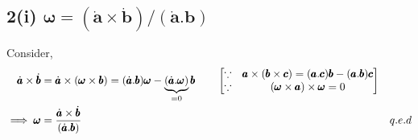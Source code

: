 \subsection{2(i) $\pmb \omega = (\dot{\pmb a} \times \dot{\pmb b}) / (\dot{\pmb a} . \pmb b)$}

Consider,
\begin{align*}
    \dot{\pmb a} \times \dot{\pmb b} &= \dot{\pmb a} \times (\pmb \omega \times \pmb b) = (\dot{\pmb a}.\pmb b)\pmb \omega - \underbrace{(\dot{\pmb a} . \pmb \omega)}_{=0} \pmb b
    \qquad
    \begin{bmatrix} \because& \pmb a \times (\pmb b \times \pmb c) = (\pmb a.\pmb c)\pmb b - (\pmb a.\pmb b)\pmb c\\
    \because& (\pmb \omega \times \pmb a) \times \pmb \omega = 0  \end{bmatrix}\\
    \implies \pmb \omega &= \frac{\dot{\pmb a} \times \dot{\pmb b}}{(\dot{\pmb a}.\pmb b)} &q.e.d
\end{align*}
